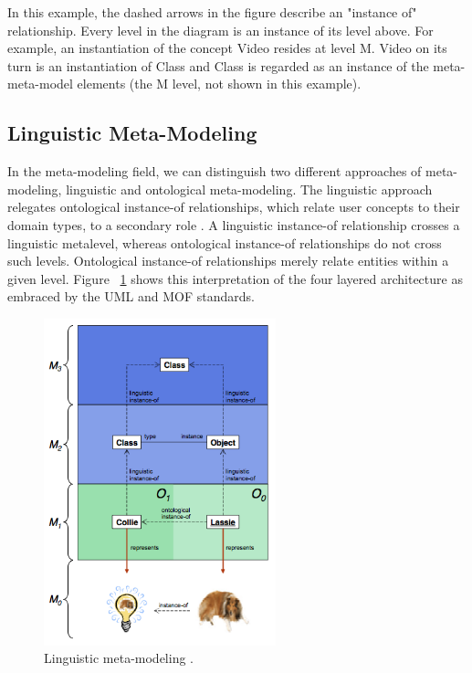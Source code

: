In this example, the dashed arrows in the figure describe an "instance of" relationship. Every level in the diagram is an instance of its level above. For example, an instantiation of the concept Video resides at level M. Video on its turn is an instantiation of Class and Class is regarded as an instance of the meta-meta-model elements (the M level, not shown in this example).

\subsection{Linguistic Meta-Modeling}

In the meta-modeling field, we can distinguish two different approaches of meta-modeling, linguistic and ontological meta-modeling. The linguistic approach relegates ontological instance-of relationships, which relate user concepts to their domain types, to a secondary role \cite{MDDFound}. A linguistic instance-of relationship crosses a linguistic metalevel, whereas ontological instance-of relationships do not cross such levels. Ontological instance-of relationships merely relate entities within a given level. Figure ~\ref{fig:ling_mm} shows this interpretation of the four layered architecture as embraced by the UML and MOF standards. 
\begin{figure}[h!]
\centering
\includegraphics[width=0.6\textwidth]{images/chap2_linguistic_mm.png}
\caption{Linguistic meta-modeling \cite{MDDFound}.}
\label{fig:ling_mm}
\end{figure}

